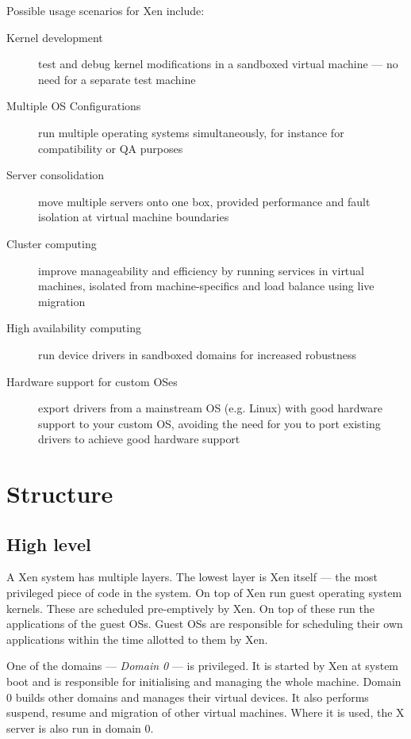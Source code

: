 \documentclass[11pt,twoside,final,openright]{xenstyle}
\begin{document}
Possible usage scenarios for Xen include:
\begin{description}
\item [Kernel development] test and debug kernel modifications in a
      sandboxed virtual machine --- no need for a separate test
      machine
\item [Multiple OS Configurations] run multiple operating systems
      simultaneously, for instance for compatibility or QA purposes
\item [Server consolidation] move multiple servers onto one box,
      provided performance and fault isolation at virtual machine
      boundaries
\item [Cluster computing] improve manageability and efficiency by
      running services in virtual machines, isolated from
      machine-specifics and load balance using live migration
\item [High availability computing] run device drivers in sandboxed
      domains for increased robustness
\item [Hardware support for custom OSes] export drivers from a
      mainstream OS (e.g. Linux) with good hardware support
      to your custom OS, avoiding the need for you to port existing
      drivers to achieve good hardware support
\end{description}

\section{Structure}

\subsection{High level}

A Xen system has multiple layers.  The lowest layer is Xen itself ---
the most privileged piece of code in the system.  On top of Xen run
guest operating system kernels.  These are scheduled pre-emptively by
Xen.  On top of these run the applications of the guest OSs.  Guest
OSs are responsible for scheduling their own applications within the
time allotted to them by Xen.

One of the domains --- { \em Domain 0 } --- is privileged.  It is
started by Xen at system boot and is responsible for initialising and
managing the whole machine.  Domain 0 builds other domains and manages
their virtual devices.  It also performs suspend, resume and
migration of other virtual machines.  Where it is used, the X server
is also run in domain 0.
\end{document}
